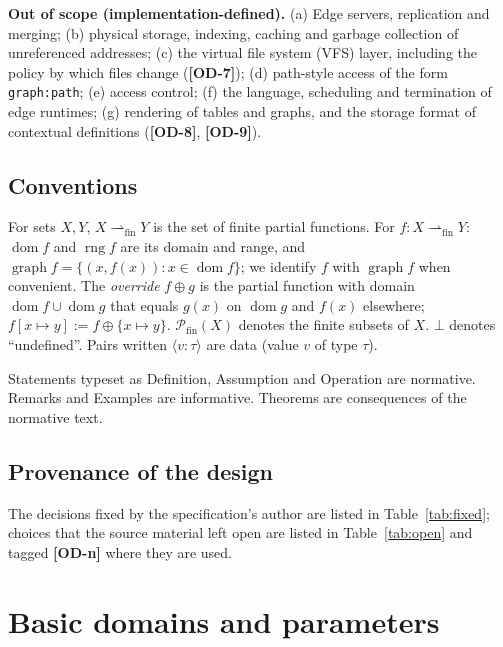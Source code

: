 \documentclass[11pt,a4paper]{article}
\theoremstyle{definition}
\theoremstyle{plain}
\theoremstyle{remark}
\newcommand{\od}[1]{\textsf{\textbf{\textcolor{BrickRed}{[OD-#1]}}}}
\newcommand{\pfin}{\rightharpoonup_{\mathrm{fin}}}
\newcommand{\dom}{\operatorname{dom}}
\newcommand{\rng}{\operatorname{rng}}
\newcommand{\graph}{\operatorname{graph}}
\newcommand{\datum}[2]{\langle #1\!:\!#2\rangle}
\newcommand{\Pfin}{\mathcal{P}_{\mathrm{fin}}}
\begin{document}
\textbf{Out of scope (implementation-defined).}
(a) Edge servers, replication and merging;
(b) physical storage, indexing, caching and garbage collection of unreferenced addresses;
(c) the virtual file system (VFS) layer, including the policy by which files change (\od{7});
(d) path-style access of the form \texttt{graph:path};
(e) access control;
(f) the language, scheduling and termination of edge runtimes;
(g) rendering of tables and graphs, and the storage format of contextual definitions (\od{8}, \od{9}).

\subsection{Conventions}
For sets $X,Y$, $X\pfin Y$ is the set of finite partial functions. For $f:X\pfin Y$:
$\dom f$ and $\rng f$ are its domain and range, and $\graph f=\{(x,f(x)) : x\in\dom f\}$;
we identify $f$ with $\graph f$ when convenient.
The \emph{override} $f\oplus g$ is the partial function with domain $\dom f\cup\dom g$ that equals $g(x)$ on $\dom g$ and $f(x)$ elsewhere;
$f[x\mapsto y]:=f\oplus\{x\mapsto y\}$.
$\Pfin(X)$ denotes the finite subsets of $X$. $\bot$ denotes ``undefined''.
Pairs written $\datum{v}{\tau}$ are data (value $v$ of type $\tau$).

Statements typeset as Definition, Assumption and Operation are normative.
Remarks and Examples are informative. Theorems are consequences of the normative text.

\subsection{Provenance of the design}
The decisions fixed by the specification's author are listed in Table~\ref{tab:fixed};
choices that the source material left open are listed in Table~\ref{tab:open} and tagged \od{n} where they are used.

\section{Basic domains and parameters}
\label{sec:domains}
\end{document}
